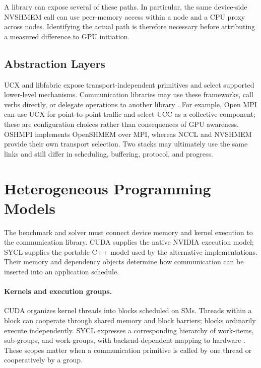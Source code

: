 A library can expose several of these paths. In particular, the same device-side NVSHMEM call can use peer-memory access within a node and a CPU proxy across nodes. Identifying the actual path is therefore necessary before attributing a measured difference to GPU initiation.

\subsection{Abstraction Layers}

UCX and libfabric expose transport-independent primitives and select supported lower-level mechanisms. Communication libraries may use these frameworks, call verbs directly, or delegate operations to another library \cite{unat_landscape_2026}. For example, Open MPI can use UCX for point-to-point traffic and select \ac{UCC} as a collective component; these are configuration choices rather than consequences of GPU awareness. OSHMPI implements OpenSHMEM over MPI, whereas NCCL and NVSHMEM provide their own transport selection. Two stacks may ultimately use the same links and still differ in scheduling, buffering, protocol, and progress.

\section{Heterogeneous Programming Models}\label{sec:programming-models}

The benchmark and solver must connect device memory and kernel execution to the communication library. CUDA supplies the native NVIDIA execution model; SYCL supplies the portable C++ model used by the alternative implementations. Their memory and dependency objects determine how communication can be inserted into an application schedule.

\paragraph{Kernels and execution groups.}
CUDA organizes kernel threads into blocks scheduled on \acp{SM}. Threads within a block can cooperate through shared memory and block barriers; blocks ordinarily execute independently. SYCL expresses a corresponding hierarchy of work-items, sub-groups, and work-groups, with backend-dependent mapping to hardware \cite{nvidia_cuda_programming_2026,hammond_comparative_2019}. These scopes matter when a communication primitive is called by one thread or cooperatively by a group.

